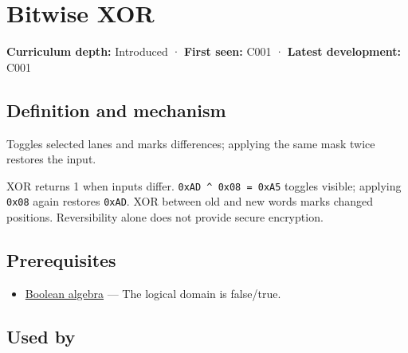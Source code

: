 \hypertarget{appendix-d49161831368}{}\label{referencestart:appendix-d49161831368}
\section{Bitwise XOR}\label{appendix-d49161831368-bitwise-xor}

\hypertarget{appendix-d49161831368-bitwise-xor}{}

\textbf{Curriculum depth:} Introduced · \textbf{First seen:} C001 · \textbf{Latest development:} C001

\begin{allmightroledefinition}

\subsection{Definition and mechanism}\label{appendix-d49161831368-definition-and-mechanism}

\hypertarget{appendix-d49161831368-definition-and-mechanism}{}

Toggles selected lanes and marks differences; applying the same mask twice restores the input.

\end{allmightroledefinition}

XOR returns 1 when inputs differ. \texttt{0xAD\ \^{}\ 0x08\ =\ 0xA5} toggles visible; applying \texttt{0x08} again restores \texttt{0xAD}. XOR between old and new words marks changed positions. Reversibility alone does not provide secure encryption.

\subsection{Prerequisites}\label{appendix-d49161831368-prerequisites}

\hypertarget{appendix-d49161831368-prerequisites}{}

\begin{itemize}
\tightlist
\item
  \hyperref[appendix-24475e1596a8]{Boolean algebra} --- The logical domain is false/true.
\end{itemize}

\subsection{Used by}\label{appendix-d49161831368-used-by}

\hypertarget{appendix-d49161831368-used-by}{}

